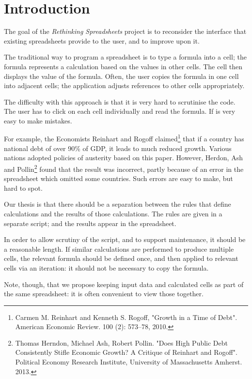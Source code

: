 \section{Introduction}

The goal of the \emph{Rethinking Spreadsheets} project is to reconsider the
interface that existing spreadsheets provide to the user, and to improve upon
it.

The traditional way to program a spreadsheet is to type a formula into a cell;
the formula represents a calculation based on the values in other cells.  The
cell then displays the value of the formula.  Often, the user copies the
formula in one cell into adjacent cells; the application adjusts references to
other cells appropriately.

The difficulty with this approach is that it is very hard to scrutinise the
code.  The user has to click on each cell individually and read the formula.
If is very easy to make mistakes.  

For example, the Economists Reinhart and Rogoff claimed\footnote{Carmen
  M. Reinhart and Kenneth S. Rogoff, "Growth in a Time of Debt". American
  Economic Review. 100 (2): 573–78, 2010.} that if a country has national debt
of over 90\% of GDP, it leads to much reduced growth.  Various nations adopted
policies of austerity based on this paper.  However, Herdon, Ash and
Pollin\footnote{Thomas Herndon, Michael Ash, Robert Pollin. "Does High Public
  Debt Consistently Stifle Economic Growth? A Critique of Reinhart and
  Rogoff". Political Economy Research Institute, University of Massachusetts
  Amherst.  2013.} found that the result was incorrect, partly because of an
error in the spreadsheet which omitted some countries.  Such errors are easy
to make, but hard to spot.

Our thesis is that there should be a separation between the rules that
define calculations and the results of those calculations.  The rules are
given in a separate script; and the results appear in the spreadsheet.

In order to allow scrutiny of the script, and to support maintenance, it
should be a reasonable length.  If similar calculations are performed to
produce multiple cells, the relevant formula should be defined once, and then
applied to relevant cells via an iteration: it should not be necessary to copy
the formula. 

Note, though, that we propose keeping input data and calculated cells as part
of the same spreadsheet: it is often convenient to view those together.

